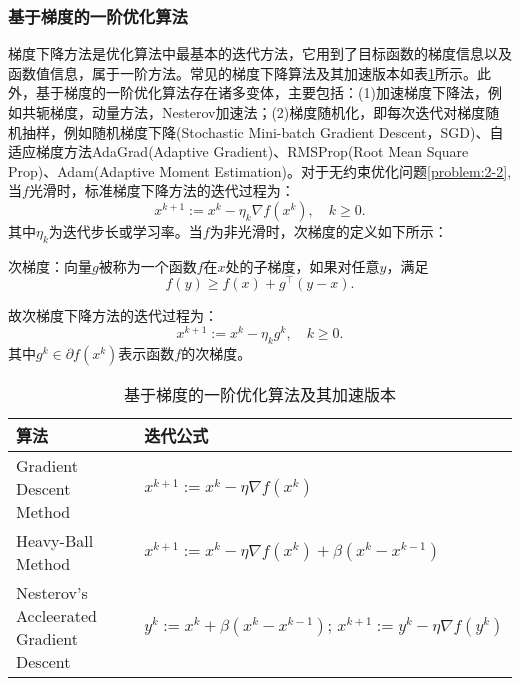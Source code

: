 \subsubsection{基于梯度的一阶优化算法}
梯度下降方法是优化算法中最基本的迭代方法，它用到了目标函数的梯度信息以及函数值信息，属于一阶方法。常见的梯度下降算法及其加速版本如表\ref{tab:2-1}所示。此外，基于梯度的一阶优化算法存在诸多变体，主要包括：(1)加速梯度下降法，例如共轭梯度，动量方法，Nesterov加速法；(2)梯度随机化，即每次迭代对梯度随机抽样，例如随机梯度下降(Stochastic Mini-batch Gradient Descent，SGD)、自适应梯度方法AdaGrad(Adaptive Gradient)、RMSProp(Root Mean Square Prop)、Adam(Adaptive Moment Estimation)。对于无约束优化问题\eqref{problem:2-2},当$f$光滑时，标准梯度下降方法的迭代过程为：
\begin{equation}\label{method:2-1}
	x^{k+1}:=x^k - \eta_k\nabla{f(x^k)},\quad k\geq 0.
\end{equation}
其中$\eta_k$为迭代步长或学习率。当$f$为非光滑时，次梯度的定义如下所示：
\begin{definition} \label{def:2-1}
	次梯度：向量$g$被称为一个函数$f$在$x$处的子梯度，如果对任意$y$，满足
	\begin{equation} 
		f(y) \geq f(x)+g^\top(y-x).
	\end{equation}
\end{definition}
故次梯度下降方法的迭代过程为：%
\begin{equation}\label{method:2-2}
	x^{k+1}:=x^k-\eta_{k}g^k,\quad{k\geq{0}}.
\end{equation}
其中$g^k\in\partial{f(x^k)}$表示函数$f$的次梯度。
\begin{table}[!htbp]
	\def\arraystretch{1.4}\centering{}
	\caption{基于梯度的一阶优化算法及其加速版本}\label{tab:2-1}
	\begin{tabular*}{\linewidth}{@{}@{\extracolsep{\fill}}ll@{}}
		\toprule
		算法                     & 迭代公式 \\
		\midrule
		Gradient Descent Method  & $x^{k+1}:=x^k - \eta\nabla{f(x^k)}$ \\
		Heavy-Ball Method        & $x^{k+1}:=x^k - \eta\nabla{f(x^k)} + \beta(x^k - x^{k-1})$ \\
		Nesterov's Accleerated Gradient Descent & $y^k:=x^k+\beta(x^k-x^{k-1});\,x^{k+1}:=y^k-\eta\nabla{f(y^k)}$\\
		\bottomrule
	\end{tabular*}
\end{table}

